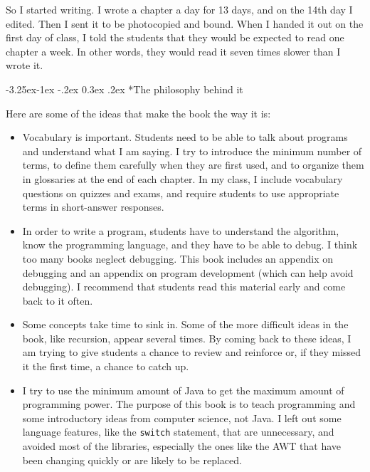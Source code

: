 \documentclass{book}
\makeatletter
\renewcommand\subsection{\@startsection {subsection}{2}{0mm}%
    {-3.25ex\@plus -1ex \@minus -.2ex}%
    {0.3ex \@plus .2ex}%
    {\normalfont\large\bfseries}}
\makeatother
\begin{document}
So I started writing.  I wrote a chapter a day for 13 days, and on
the 14th day I edited.  Then I sent it to be photocopied and bound.
When I handed it out on the first day of class, I told the students
that they would be expected to read one chapter a week.  In other
words, they would read it seven times slower than I wrote it.


\subsection*{The philosophy behind it}

Here are some of the ideas that make the book the way it is:

\begin{itemize}

\item Vocabulary is important.  Students need to be able to talk
about programs and understand what I am saying.  I try to
introduce the minimum number of terms, to define them carefully 
when they are first used, and to organize them in glossaries
at the end of each chapter.  In my class, I include vocabulary
questions on quizzes and exams, and require students to use
appropriate terms in short-answer responses.

\item In order to write a program, students have to understand the
algorithm, know the programming language, and they have to be
able to debug.  I think too many books neglect debugging.  This
book includes an appendix on debugging and an appendix on program
development (which can help avoid debugging).  I recommend that
students read this material early and come back to it often.

\item Some concepts take time to sink in.  Some of the more
difficult ideas in the book, like recursion, appear several times.
By coming back to these ideas, I am trying to give students a
chance to review and reinforce or, if they missed it the first time,
a chance to catch up.

\item I try to use the minimum amount of Java to get the
maximum amount of programming power.  The purpose of this book
is to teach programming and some introductory ideas from computer
science, not Java.  I left out some language features, like
the {\tt switch} statement, that are unnecessary, and avoided
most of the libraries, especially the ones like the AWT that have been
changing quickly or are likely to be replaced.

\end{itemize}
\end{document}
